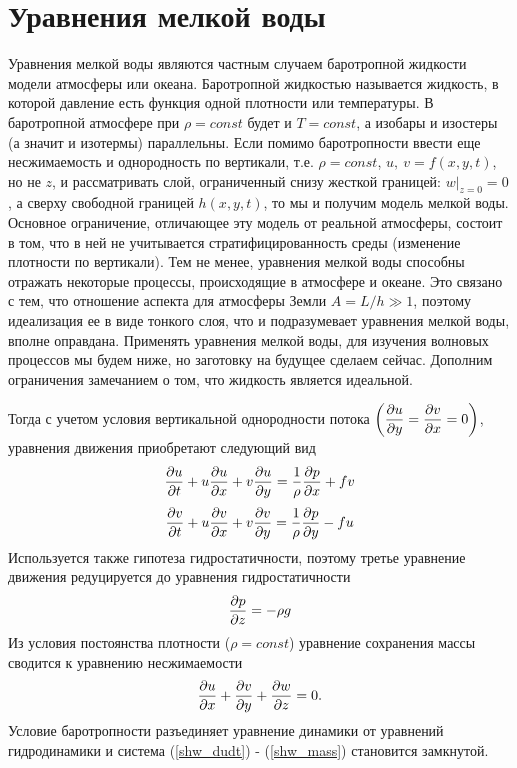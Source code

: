 \section{{\color{done}Уравнения мелкой воды}}
    Уравнения мелкой воды являются частным случаем баротропной жидкости модели атмосферы или океана. Баротропной жидкостью называется жидкость, в которой давление есть функция одной плотности или температуры. В баротропной атмосфере при $\rho=const$ будет и $T=const$, а изобары и изостеры (а значит и изотермы) параллельны. Если помимо баротропности ввести еще несжимаемость и однородность по вертикали, т.е. $\rho=const$, $u,\: v=f(x,y,t)$, но не $z$, и рассматривать слой, ограниченный снизу жесткой границей: $w|_{z=0}=0$, а сверху свободной границей $h(x,y,t)$, то мы и получим модель мелкой воды. Основное ограничение, отличающее эту модель от реальной атмосферы, состоит в том, что в ней не учитывается стратифицированность среды (изменение плотности по вертикали). Тем не менее, уравнения мелкой воды способны отражать некоторые процессы, происходящие в атмосфере и океане. Это связано с тем, что отношение аспекта для атмосферы Земли $A=L/h\gg1$, поэтому идеализация ее в виде тонкого слоя, что и подразумевает уравнения мелкой воды, вполне оправдана. Применять уравнения мелкой воды, для изучения волновых процессов мы будем ниже, но заготовку на будущее сделаем сейчас. Дополним ограничения замечанием о том, что жидкость является идеальной. 

    Тогда с учетом условия вертикальной однородности потока $\left(\displaystyle\frac{\partial u}{\partial y}=\displaystyle\frac{\partial v}{\partial x}=0\right)$, уравнения движения приобретают следующий вид
    \begin{equation}
    \label{shw_dudt}
        \displaystyle\frac{\partial u}{\partial t} + u\displaystyle\frac{\partial u}{\partial x} + v\displaystyle\frac{\partial u}{\partial y} = \frac{1}{\rho} \displaystyle\frac{\partial p}{\partial x} + fv \\
    \end{equation} 
    \begin{equation}
    \label{shw_dvdt}
        \displaystyle\frac{\partial v}{\partial t} + u\displaystyle\frac{\partial v}{\partial x} + v\displaystyle\frac{\partial v}{\partial y} = \frac{1}{\rho} \displaystyle\frac{\partial p}{\partial y} - fu \\
    \end{equation} 
    Используется также гипотеза гидростатичности, поэтому третье уравнение движения редуцируется до уравнения гидростатичности
    \begin{equation}
    \label{shw_hydrostat}
        \displaystyle\frac{\partial p}{\partial z} = -\rho g \\
    \end{equation} 
    Из условия постоянства плотности ($\rho=const$) уравнение сохранения массы сводится к уравнению несжимаемости
    \begin{equation}
    \label{shw_mass}
        \displaystyle\frac{\partial u}{\partial x} + \displaystyle\frac{\partial v}{\partial y} + \displaystyle\frac{\partial w}{\partial z} = 0.
    \end{equation} 
    Условие баротропности разъединяет уравнение динамики от уравнений гидродинамики и система (\ref{shw_dudt}) - (\ref{shw_mass}) становится замкнутой. 

